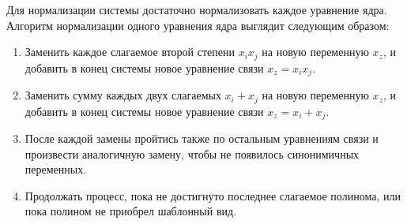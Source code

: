 Для нормализации системы достаточно нормализовать каждое уравнение ядра. Алгоритм нормализации одного уравнения ядра выглядит следующим образом:
\begin{enumerate}
	\item Заменить каждое слагаемое второй степени \(x_ix_j\) на новую переменную \(x_z\), и добавить в конец системы новое уравнение связи \(x_z=x_ix_j\).
	\item Заменить сумму каждых двух слагаемых \(x_i+x_j\) на новую переменную \(x_z\), и добавить в конец системы новое уравнение связи \(x_z=x_i+x_j\).
	\item После каждой замены пройтись также по остальным уравнениям связи и произвести аналогичную замену, чтобы не появилось синонимичных переменных.
	\item Продолжать процесс, пока не достигнуто последнее слагаемое полинома, или пока полином не приобрел шаблонный вид.
\end{enumerate} 


\newpage


%

